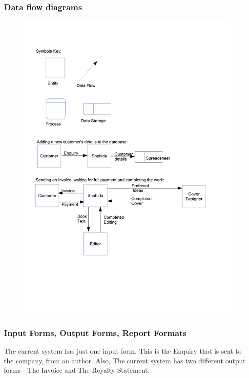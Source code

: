 \subsubsection{Data flow diagrams}

\begin{figure}[H]
    \includegraphics[width=\textwidth]{./Analysis/Data Flow Diagrams 1.pdf}
\end{figure}

\subsubsection{Input Forms, Output Forms, Report Formats}

The current system has just one input form. This is the Enquiry that is sent to the company, from an author. Also, The current system has two different output forms - The Invoice and The Royalty Statement.


